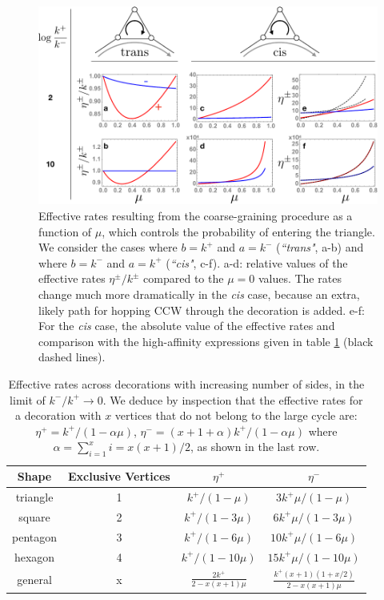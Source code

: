 \documentclass[amsmath, preprintnumbers, 10pt, twocolumn, pre, bibliograpy]{revtex4-1}
\providecommand{\DIFaddbeginFL}{} %
\providecommand{\DIFaddendFL}{} %
\newcommand{\DIFaddincludegraphics}[2][]{{\color{blue}\fbox{\DIFOincludegraphics[#1]{#2}}}} %
\DeclareRobustCommand{\DIFaddbeginFL}{\DIFOaddbeginFL \let\includegraphics\DIFaddincludegraphics} %
\DeclareRobustCommand{\DIFaddendFL}{\DIFOaddendFL \let\includegraphics\DIFOincludegraphics} %
\begin{document}
\begin{figure}
\centering
\includegraphics[width= \linewidth]{fig-2}
 \caption{Effective rates resulting from the coarse-graining procedure as a function of $\mu$, which controls the probability of entering the triangle. We consider the cases where $b = k^+$ and $a = k^-$ (\DIFaddbeginFL {\it \DIFaddendFL ``trans"\DIFaddbeginFL }\DIFaddendFL , a-b) and where $b = k^-$ and $a = k^+$ (\DIFaddbeginFL {\it \DIFaddendFL ``cis"\DIFaddbeginFL }\DIFaddendFL , c-f).  a-d: relative values of the effective rates $\eta^\pm /k^\pm$ compared to the $\mu = 0$ values. The rates change much more dramatically in the \DIFaddbeginFL {\it \DIFaddendFL cis\DIFaddbeginFL } \DIFaddendFL case, because an extra, likely path for hopping CCW through the decoration is added. e-f: For the \DIFaddbeginFL {\it \DIFaddendFL cis\DIFaddbeginFL } \DIFaddendFL case, the absolute value of the effective rates and comparison with the high-affinity expressions given in table \ref{tab:rates} (black dashed lines).}
\label{fig:effrates}
\end{figure}

\begin{table}
\centering
\begin{tabular}{|c|c|c|c|} \hline
Shape &  Exclusive Vertices  & $\eta^+$ & $\eta^-$ \\ \hline
triangle & 1 &  $k^+/(1-\mu)$ & $3k^+\mu /(1-\mu) $\\ \hline
square & 2 & $k^+/(1-3\mu)$ & $6k^+\mu /(1-3\mu)$ \\ \hline
pentagon & 3 & $k^+/(1-6\mu)$ & $10k^+\mu /(1-6\mu) $\\ \hline
hexagon & 4 & $k^+/(1-10\mu)$ & $15k^+\mu /(1-10\mu)$\\ \hline
general & x & $\frac{2k^+}{2 - x(x+1)\mu}$ &$ \frac{k^+(x+1)(1 + x/2)}{2 - x(x+1)\mu}$ \\ \hline
\end{tabular}
\caption{Effective rates across decorations with increasing number of sides, in the limit of $k^-/k^+ \to 0$. We deduce by inspection that the effective rates for a decoration with $x$ vertices that do not belong to the large cycle are: $\eta^+ = k^+/(1 - \alpha \mu)$, $\eta^- = (x + 1 + \alpha) k^+/(1 -\alpha \mu) $ where $\alpha = \sum_{i=1}^x i = x (x +1)/2$, as shown in the last row.}
\label{tab:rates}
\end{table}
\end{document}

